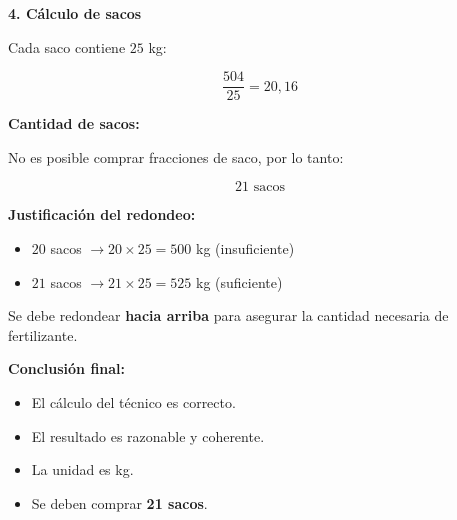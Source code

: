 \documentclass[12pt]{article}
\begin{document}
	\vspace{0.3cm}
	
	\textbf{4. Cálculo de sacos}
	
	Cada saco contiene $25$ kg:
	
	\[
	\frac{504}{25} = 20{,}16
	\]
	
	\textbf{Cantidad de sacos:}
	
	No es posible comprar fracciones de saco, por lo tanto:
	
	\[
	\boxed{21 \text{ sacos}}
	\]
	
	\textbf{Justificación del redondeo:}
	
	\begin{itemize}
		\item $20$ sacos $\rightarrow 20 \times 25 = 500$ kg (insuficiente)
		\item $21$ sacos $\rightarrow 21 \times 25 = 525$ kg (suficiente)
	\end{itemize}
	
	Se debe redondear \textbf{hacia arriba} para asegurar la cantidad necesaria de fertilizante.
	
	\vspace{0.3cm}
	
	\textbf{Conclusión final:}
	
	\begin{itemize}
		\item El cálculo del técnico es correcto.
		\item El resultado es razonable y coherente.
		\item La unidad es kg.
		\item Se deben comprar \textbf{21 sacos}.
	\end{itemize}
	
\end{document}
